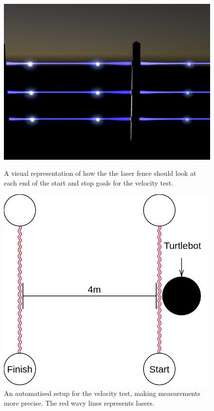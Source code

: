 \begin{figure}[H]
    \centering
    \begin{minipage}[b]{0.48\linewidth}
    \centering
    \includegraphics[width=\textwidth]{figures/laser.jpg}
    \caption{A visual representation of how the the laser fence should look at each end of the start and stop goals for the velocity test.}
    \label{fig:laserScan}
    \end{minipage}
    \hspace{0.2cm}
    \begin{minipage}[b]{0.48\linewidth}
    \centering
    \includegraphics[width=\textwidth]{figures/veltest1.png}
    \caption{An automatised setup for the velocity test, making measurements more precise. The red wavy lines represents lasers.}
    \label{fig:velset}    
    \end{minipage}
\end{figure}

